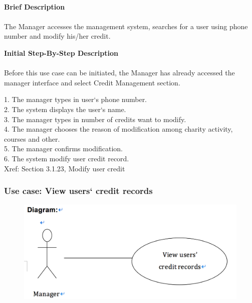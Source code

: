 \documentclass[12pt]{report}
\begin{document}
\paragraph{}
\begin{flushleft}
\textbf{Brief Description }
\paragraph{}
The Manager accesses the management system, searches for a user using phone number and modify his/her credit.\\

\begin{flushleft}
\textbf{Initial Step-By-Step Description }
\paragraph{}
Before this use case can be initiated, the Manager has already accessed the manager interface and select Credit Management section.

\begin{flushleft}
1.	The manager types in user`s phone number. \\
2.	The system displays the user`s name. \\
3.	The manager types in number of credits want to modify. \\
4.	The manager chooses the reason of modification among charity activity, courses and other. \\
5.	The manager confirms modification. \\
6.	The system modify user credit record.  \\
Xref: Section 3.1.23, Modify user credit
\end{flushleft}
\end{flushleft}
\end{flushleft}

\newpage
\subsubsection{Use case:  View users` credit records }

\begin{figure}[!htb]
  \includegraphics{210.PNG}
\end{figure}
\end{document}
